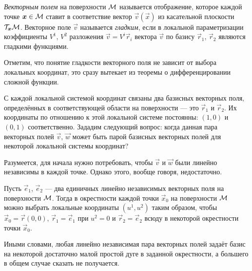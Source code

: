 \begin{definition}
	\textit{Векторным полем} на поверхности $\mathcal{M}$ называется отображение, которое каждой точке $\boldsymbol{x} \in \mathcal{M}$ ставит в соответствие вектор $\vec{v}(\vec{x})$ из касательной плоскости $\mathcal{T}_{\boldsymbol{x}}\mathcal{M}$. Векторное поле $\vec{v}$ называется \textit{гладким}, если в локальной параметризации коэффициенты $V^1$, $V^2$ разложения $\vec{v} = V^i\vec{r}_i$ вектора $\vec{v}$ по базису $\vec{r}_1$, $\vec{r}_2$ являются гладкими функциями.
\end{definition}

Отметим, что понятие гладкости векторного поля не зависит от выбора локальных координат, это сразу вытекает из теоремы о дифференцировании сложной функции.

С каждой локальной системой координат связаны два базисных векторных поля, определённых в соответствующей области на поверхности --- это $\vec{r}_1$ и $\vec{r}_2$. Их координаты по отношению к этой локальной системе постоянны: $(1, 0)$ и $(0, 1)$ соответственно. Зададим следующий вопрос: когда данная пара векторных полей $\vec{v}$, $\vec{w}$ может быть парой базисных векторных полей для некоторой локальной системы координат?

Разумеется, для начала нужно потребовать, чтобы $\vec{v}$ и $\vec{w}$ были линейно независимы в каждой точке. Однако этого, вообще говоря, недостаточно.

\begin{lemma} \label{lemma:WeakBasis}
	Пусть $\vec{e}_1$, $\vec{e}_2$ --- два единичных линейно независимых векторных поля на поверхности $\mathcal{M}$. Тогда в окрестности каждой точки $\vec{x}_0$ на поверхности $\mathcal{M}$ можно выбрать локальные координаты $(u^1, u^2)$ таким образом, чтобы $\vec{x}_0 = \vec{r}(0, 0)$, $\vec{r}_1 = \vec{e}_1$ при $u^2 = 0$ и $\vec{r}_2 = \vec{e}_2$ всюду в некоторой окрестности точки $\vec{x}_0$.
\end{lemma}

Иными словами, любая линейно независимая пара векторных полей задаёт базис на некоторой достаточно малой простой дуге в заданной окрестности, а большего в общем случае сказать не получается.

